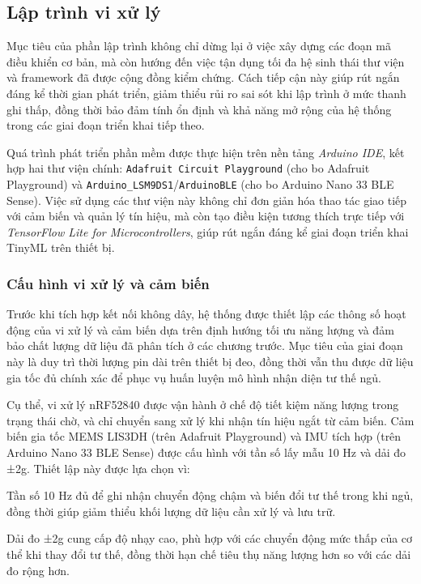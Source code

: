 \subsection{Lập trình vi xử lý}

Mục tiêu của phần lập trình không chỉ dừng lại ở việc xây dựng các đoạn mã 
điều khiển cơ bản, mà còn hướng đến việc tận dụng tối đa hệ sinh thái 
thư viện và framework đã được cộng đồng kiểm chứng. Cách tiếp cận này 
giúp rút ngắn đáng kể thời gian phát triển, giảm thiểu rủi ro sai sót khi 
lập trình ở mức thanh ghi thấp, đồng thời bảo đảm tính ổn định và khả năng 
mở rộng của hệ thống trong các giai đoạn triển khai tiếp theo.  

Quá trình phát triển phần mềm được thực hiện trên nền tảng \textit{Arduino IDE}, 
kết hợp hai thư viện chính: \texttt{Adafruit Circuit Playground} 
(cho bo Adafruit Playground) và \texttt{Arduino\_LSM9DS1}/\texttt{ArduinoBLE} 
(cho bo Arduino Nano 33 BLE Sense). Việc sử dụng các thư viện này không 
chỉ đơn giản hóa thao tác giao tiếp với cảm biến và quản lý tín hiệu, 
mà còn tạo điều kiện tương thích trực tiếp với \textit{TensorFlow Lite for 
Microcontrollers}, giúp rút ngắn đáng kể giai đoạn triển khai TinyML 
trên thiết bị.  

\subsubsection{Cấu hình vi xử lý và cảm biến}

Trước khi tích hợp kết nối không dây, hệ thống được thiết lập các thông số hoạt động của vi xử lý và cảm biến dựa trên định hướng tối ưu năng lượng và đảm bảo chất lượng dữ liệu đã phân tích ở các chương trước. Mục tiêu của giai đoạn này là duy trì thời lượng pin dài trên thiết bị đeo, đồng thời vẫn thu được dữ liệu gia tốc đủ chính xác để phục vụ huấn luyện mô hình nhận diện tư thế ngủ.

Cụ thể, vi xử lý nRF52840 được vận hành ở chế độ tiết kiệm năng lượng trong trạng thái chờ, và chỉ chuyển sang xử lý khi nhận tín hiệu ngắt từ cảm biến. Cảm biến gia tốc MEMS LIS3DH (trên Adafruit Playground) và IMU tích hợp (trên Arduino Nano 33 BLE Sense) được cấu hình với tần số lấy mẫu 10 Hz và dải đo ±2g. Thiết lập này được lựa chọn vì:

Tần số 10 Hz đủ để ghi nhận chuyển động chậm và biến đổi tư thế trong khi ngủ, đồng thời giúp giảm thiểu khối lượng dữ liệu cần xử lý và lưu trữ.

Dải đo ±2g cung cấp độ nhạy cao, phù hợp với các chuyển động mức thấp của cơ thể khi thay đổi tư thế, đồng thời hạn chế tiêu thụ năng lượng hơn so với các dải đo rộng hơn.

